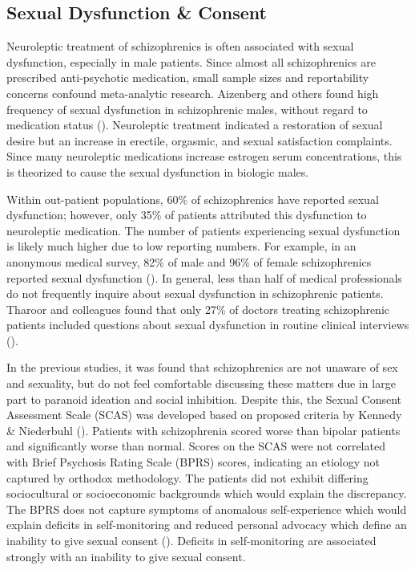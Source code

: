 \documentclass[]{article}
\begin{document}
	\subsection{Sexual Dysfunction \& Consent}
		
		Neuroleptic treatment of schizophrenics is often associated with sexual dysfunction, especially in male patients. Since almost all schizophrenics are prescribed anti-psychotic medication, small sample sizes and reportability concerns confound meta-analytic research. Aizenberg and others found high frequency of sexual dysfunction in schizophrenic males, without regard to medication status (\cite{MarquesSexualdysfunctionpeople2012,JoyceCognitiveheterogeneityfirstepisode2005,SmithSexualdysfunctionpatients2002}). Neuroleptic treatment indicated a restoration of sexual desire but an increase in erectile, orgasmic, and sexual satisfaction complaints. Since many neuroleptic medications increase estrogen serum concentrations, this is theorized to cause the sexual dysfunction in biologic males. 
		
		Within out-patient populations, 60\% of schizophrenics have reported sexual dysfunction; however, only 35\% of patients attributed this dysfunction to neuroleptic medication. The number of patients experiencing sexual dysfunction is likely much higher due to low reporting numbers. For example, in an anonymous medical survey, 82\% of male and 96\% of female schizophrenics reported sexual dysfunction (\cite{MacLeanActivityIndependentHomeostasisRhythmically2003,McCreadieNithsdaleschizophreniasurveys1992,ValmaggiaCognitivebehaviouraltherapyrefractory2005,WieckAntipsychoticinducedhyperprolactinaemiawomen2003}). In general, less than half of medical professionals do not frequently inquire about sexual dysfunction in schizophrenic patients. Tharoor and colleagues found that only 27\% of doctors treating schizophrenic patients included questions about sexual dysfunction in routine clinical interviews (\cite{TharoorSexualdysfunctionsschizophrenia2015}).
		
		In the previous studies, it was found that schizophrenics are not unaware of sex and sexuality, but do not feel comfortable discussing these matters due in large part to paranoid ideation and social inhibition. Despite this, the Sexual Consent Assessment Scale (SCAS) was developed based on proposed criteria by Kennedy \& Niederbuhl (\cite{MandarelliCompetenceConsentSexual2012}). Patients with schizophrenia scored worse than bipolar patients and significantly worse than normal. Scores on the SCAS were not correlated with Brief Psychosis Rating Scale (BPRS) scores, indicating an etiology not captured by orthodox methodology. The patients did not exhibit differing sociocultural or socioeconomic backgrounds which would explain the discrepancy. The BPRS does not capture symptoms of anomalous self-experience which would explain deficits in self-monitoring and reduced personal advocacy which define an inability to give sexual consent (\cite{MandarelliRelationshipExecutiveFunctions2012,MandarelliTreatmentDecisionMakingCapacity2016}). Deficits in self-monitoring are associated strongly with an inability to give sexual consent.
		
\end{document}
